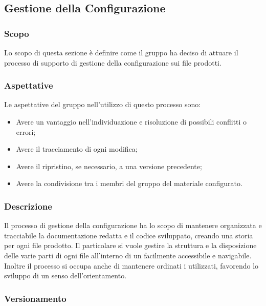 \subsection{Gestione della Configurazione}
\subsubsection{Scopo}
Lo scopo di questa sezione è definire come il gruppo ha deciso di attuare il processo di supporto di gestione della configurazione sui file prodotti.

\subsubsection{Aspettative}
Le aspettative del gruppo \Gruppo{} nell'utilizzo di questo processo sono:
\begin{itemize}
	\item Avere un vantaggio nell'individuazione e risoluzione di possibili conflitti o errori;
	\item Avere il tracciamento di ogni modifica;
	\item Avere il ripristino, se necessario, a una versione precedente;
	\item Avere la condivisione tra i membri del gruppo del materiale configurato.
\end{itemize}

\subsubsection{Descrizione}
Il processo di gestione della configurazione ha lo scopo di mantenere organizzata e tracciabile la documentazione redatta e il codice sviluppato, creando una storia per ogni file prodotto. Il particolare si vuole gestire la struttura e la disposizione delle varie parti di ogni file all'interno di un  facilmente accessibile e navigabile.
Inoltre il processo si occupa anche di mantenere ordinati i  utilizzati, favorendo lo sviluppo di un senso dell'orientamento.

\subsubsection{Versionamento}
